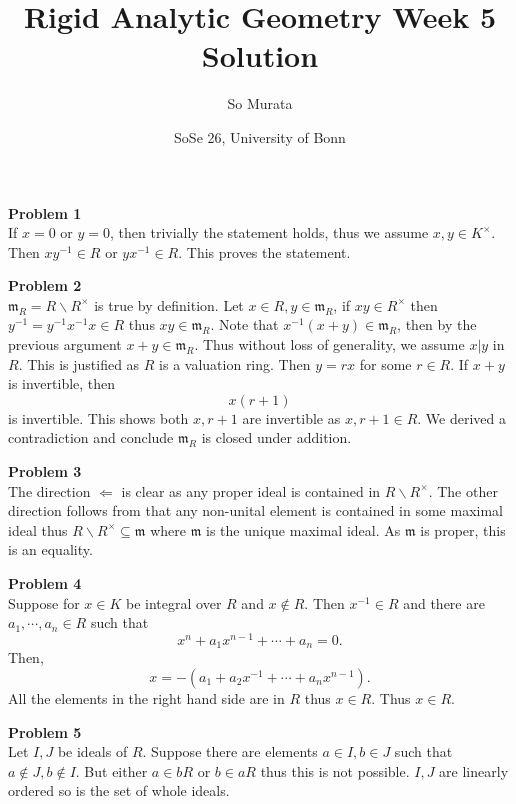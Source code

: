 \documentclass[10pt]{article}
\title{Rigid Analytic Geometry Week 5 Solution}
\author{So Murata}
\date{SoSe 26, University of Bonn}
\newcommand{\m}[0]{\mathfrak{m}}
\begin{document}
\maketitle

\par\textbf{Problem 1}\\
If $x=0$ or $y=0$, then trivially the statement holds, thus we assume $x,y\in K^\times$. Then $xy^{-1}\in R$ or $yx^{-1}\in R$. This proves the statement.
\par\textbf{Problem 2}\\
$\m_R=R\backslash R^\times$ is true by definition. Let $x\in R,y\in\m_R$, if $xy\in R^\times$ then $y^{-1} = y^{-1}x^{-1}x \in R$ thus $xy\in\m_R$. 
Note that $x^{-1}(x+y)\in\m_R$, then by the previous argument $x+y\in\m_R$. Thus without loss of generality, we assume $x|y$ in $R$. This is justified as $R$ is a valuation ring. Then $y=rx$ for some $r\in R$. If $x+y$ is invertible, then
\begin{equation*}
    x(r+1)
\end{equation*}
is invertible. This shows both $x,r+1$ are invertible as $x,r+1\in R$. We derived a contradiction and conclude $\m_R$ is closed under addition.
\par\textbf{Problem 3}\\
The direction $\Leftarrow$ is clear as any proper ideal is contained in $R\backslash R^\times$. The other direction follows from that any non-unital element is contained in some maximal ideal thus $R\backslash R^\times\subseteq\m$ where $\m$ is the unique maximal ideal. As $\m$ is proper, this is an equality.
\par\textbf{Problem 4}\\
Suppose for $x\in K$ be integral over $R$ and $x\not\in R$. Then $x^{-1}\in R$ and there are $a_1,\cdots,a_n\in R$ such that 
\begin{equation*}
    x^n+a_1x^{n-1}+\cdots+a_n = 0.
\end{equation*}
Then,
\begin{equation*}
    x = -(a_1+a_2x^{-1}+\cdots+a_nx^{n-1}).
\end{equation*}
All the elements in the right hand side are in $R$ thus $x\in R$. Thus $x\in R$.
\par\textbf{Problem 5}\\
Let $I,J$ be ideals of $R$. Suppose there are elements $a\in I,b\in J$ such that $a\not\in J,b\not\in I$. But either $a\in bR$ or $b\in aR$ thus this is not possible. $I,J$ are linearly ordered so is the set of whole ideals.
\end{document}
